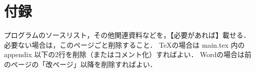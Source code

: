 \chapter*{付録}	%

プログラムのソースリスト，その他関連資料などを，【必要があれば】載せる．
必要ない場合は，このページごと削除すること．
\TeX の場合は main.tex 内の \yen appendix 以下の2行を削除（またはコメント化）すればよい．
Wordの場合は前のページの「改ページ」以降を削除すればよい．
